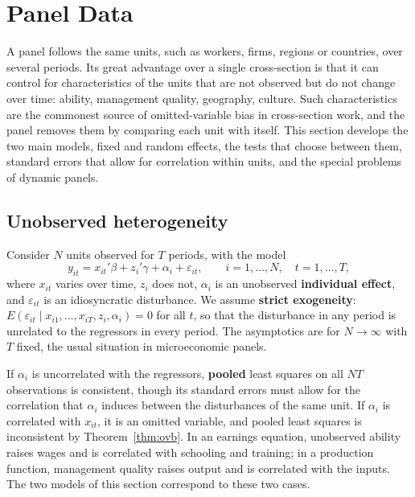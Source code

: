 \documentclass[11pt,a4paper]{article}
\numberwithin{equation}{section}
\theoremstyle{definition}
\begin{document}
\section{Panel Data}
\label{sec:panel}

A panel follows the same units, such as workers, firms, regions or countries, over several periods. Its great advantage over a single cross-section is
that it can control for characteristics of the units that are not observed but do not change over time: ability, management quality,
geography, culture. Such characteristics are the commonest source of omitted-variable bias in cross-section work, and the panel removes them by
comparing each unit with itself. This section develops the two main models, fixed and random effects, the tests that choose between them,
standard errors that allow for correlation within units, and the special problems of dynamic panels.

\subsection{Unobserved heterogeneity}
\label{ssec:hetero-panel}

Consider $N$ units observed for $T$ periods, with the model
\[
y_{it} = x_{it}'\beta + z_i'\gamma + \alpha_i + \varepsilon_{it}, \qquad i = 1, \dots, N, \quad t = 1, \dots, T,
\]
where $x_{it}$ varies over time, $z_i$ does not, $\alpha_i$ is an unobserved \textbf{individual effect}, and $\varepsilon_{it}$ is an idiosyncratic disturbance. We assume \textbf{strict
exogeneity}: $E(\varepsilon_{it} \mid x_{i1}, \dots, x_{iT}, z_i, \alpha_i) = 0$ for all $t$, so that the disturbance in any period is unrelated to the regressors in every period.
The asymptotics are for $N \to \infty$ with $T$ fixed, the usual situation in microeconomic panels.

If $\alpha_i$ is uncorrelated with the regressors, \textbf{pooled} least squares on all $NT$ observations is consistent, though its standard errors must allow for the
correlation that $\alpha_i$ induces between the disturbances of the same unit. If $\alpha_i$ is correlated with $x_{it}$, it is an omitted variable, and pooled least
squares is inconsistent by Theorem~\ref{thm:ovb}. In an earnings equation, unobserved ability raises wages and is correlated with schooling and training;
in a production function, management quality raises output and is correlated with the inputs. The two models of this section correspond to these
two cases.
\end{document}
